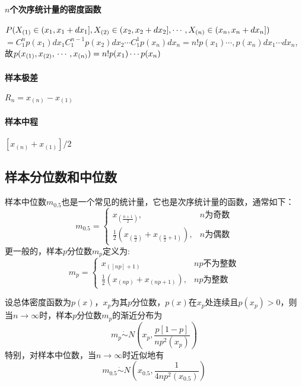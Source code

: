 \paragraph{$n$个次序统计量的密度函数} $P(X_{(1)}\in (x_1 ,x_1 +dx_1],X_{(2)}\in (x_2 ,x_2 +dx_2],\cdots,X_{(n)}\in (x_n ,x_n +\\ dx_n] )$$=C_1^n p(x_1)dx_1 C_1^{n-1 }p(x_2)dx_2\cdots C_1^1 p(x_n)dx_n=n!p(x_1)\cdots,p(x_n)dx_1\cdots dx_n$,故$p(x_{(1)},x_{(2)},\\\cdots,x_{(n)})=n!p(x_1)\cdots p(x_n)$

    \paragraph{样本极差} $R_n=x_{(n)}-x_{(1)}$
    \paragraph{样本中程} $[x_{(n)}+x_{(1)}]/2$

    \subsection{样本分位数和中位数}
    样本中位数$m_{0.5}$也是一个常见的统计量，它也是次序统计量的函数，通常如下：
    $$
        m_{0.5}=\left\{
        \begin{array}{ll}
            x_{(\frac{n+1}{2})},                                & n\text{为奇数} \\
            \frac{1}{2}(x_{(\frac{n}{2})}+x_{(\frac{n}{2}+1)}), & n\text{为偶数}
        \end{array}
        \right.
    $$
    更一般的，样本$p$分位数$m_p$定义为:
    $$
        m_p=\left\{
        \begin{array}{ll}
            x_{([np]+1)}                      & np\text{不为整数} \\
            \frac{1}{2}(x_{(np)}+x_{(np+1)}), & np\text{为整数}
        \end{array}
        \right.
    $$
    \begin{theorem}
        设总体密度函数为$p(x)$，$x_p$为其$p$分位数，$p(x)$在$x_p$处连续且$p(x_p)>0$，则当$n\rightarrow \infty$时，样本$p$分位数$m_p$的渐近分布为
        $$
            m_p \dot{\sim} N(x_p,\frac{p[1-p]}{n p^2(x_p)})
        $$
        特别，对样本中位数，当$n \rightarrow \infty$时近似地有
        $$
            m_{0.5} \dot{\sim} N(x_{0.5},\frac{1}{4n p^2(x_{0.5})})
        $$

    \end{theorem}
